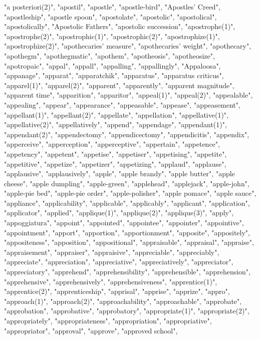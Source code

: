 "a posteriori(2)",
"apostil",
"apostle",
"apostle-bird",
"Apostles' Creed",
"apostleship",
"apostle spoon",
"apostolate",
"apostolic",
"apostolical",
"apostolically",
"Apostolic Fathers",
"apostolic succession",
"apostrophe(1)",
"apostrophe(2)",
"apostrophic(1)",
"apostrophic(2)",
"apostrophize(1)",
"apostrophize(2)",
"apothecaries' measure",
"apothecaries' weight",
"apothecary",
"apothegm",
"apothegmatic",
"apothem",
"apotheosis",
"apotheosize",
"apotropaic",
"appal",
"appall",
"appalling",
"appallingly",
"Appaloosa",
"appanage",
"apparat",
"apparatchik",
"apparatus",
"apparatus criticus",
"apparel(1)",
"apparel(2)",
"apparent",
"apparently",
"apparent magnitude",
"apparent time",
"apparition",
"apparitor",
"appeal(1)",
"appeal(2)",
"appealable",
"appealing",
"appear",
"appearance",
"appeasable",
"appease",
"appeasement",
"appellant(1)",
"appellant(2)",
"appellate",
"appellation",
"appellative(1)",
"appellative(2)",
"appellatively",
"append",
"appendage",
"appendant(1)",
"appendant(2)",
"appendectomy",
"appendicectomy",
"appendicitis",
"appendix",
"apperceive",
"apperception",
"apperceptive",
"appertain",
"appetence",
"appetency",
"appetent",
"appetise",
"appetiser",
"appetising",
"appetite",
"appetitive",
"appetize",
"appetizer",
"appetizing",
"applaud",
"applause",
"applausive",
"applausively",
"apple",
"apple brandy",
"apple butter",
"apple cheese",
"apple dumpling",
"apple-green",
"applehead",
"applejack",
"apple-john",
"apple-pie bed",
"apple-pie order",
"apple-polisher",
"apple pomace",
"apple sauce",
"appliance",
"applicability",
"applicable",
"applicably",
"applicant",
"application",
"applicator",
"applied",
"applique(1)",
"applique(2)",
"applique(3)",
"apply",
"appoggiatura",
"appoint",
"appointed",
"appointee",
"appointer",
"appointive",
"appointment",
"apport",
"apportion",
"apportionment",
"apposite",
"appositely",
"appositeness",
"apposition",
"appositional",
"appraisable",
"appraisal",
"appraise",
"appraisement",
"appraiser",
"appraisive",
"appreciable",
"appreciably",
"appreciate",
"appreciation",
"appreciative",
"appreciatively",
"appreciator",
"appreciatory",
"apprehend",
"apprehensibility",
"apprehensible",
"apprehension",
"apprehensive",
"apprehensively",
"apprehensiveness",
"apprentice(1)",
"apprentice(2)",
"apprenticeship",
"apprisal",
"apprise",
"apprize",
"appro",
"approach(1)",
"approach(2)",
"approachability",
"approachable",
"approbate",
"approbation",
"approbative",
"approbatory",
"appropriate(1)",
"appropriate(2)",
"appropriately",
"appropriateness",
"appropriation",
"appropriative",
"appropriator",
"approval",
"approve",
"approved school",
